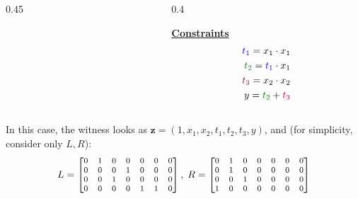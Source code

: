 \documentclass{zkdl-presentation-template}
\begin{document}
\begin{frame}
\begin{example}
\begin{columns}
\begin{column}{0.45\textwidth}
\begin{center}
{
        }
    \end{center}
\end{column}

\begin{column}{0.4\textwidth}
    \begin{center}
        \underline{\textbf{Constraints}}
        \begin{align*}
            \textcolor{blue}{t_1} = x_1 \cdot x_1 \\
            \textcolor{green!50!black}{t_2} = \textcolor{blue}{t_1} \cdot x_1 \\
            \textcolor{purple}{t_3} = x_2 \cdot x_2 \\
            y = \textcolor{green!50!black}{t_2} + \textcolor{purple}{t_3}
        \end{align*}
    \end{center}
\end{column}
\end{columns}

\vspace{10px}

\pause In this case, the witness looks as $\boldsymbol{z} = (1,x_1,x_2,t_1,t_2,t_3,y)$,
and (for simplicity, consider only $L,R$):
\begin{gather*}
    \footnotesize L = \begin{bmatrix}
        0 & 1 & 0 & 0 & 0 & 0 & 0\\
        0 & 0 & 0 & 1 & 0 & 0 & 0 \\
        0 & 0 & 1 & 0 & 0 & 0 & 0 \\
        0 & 0 & 0 & 0 & 1 & 1 & 0
    \end{bmatrix}, \; R = \begin{bmatrix}
        0 & 1 & 0 & 0 & 0 & 0 & 0\\
        0 & 1 & 0 & 0 & 0 & 0 & 0 \\
        0 & 0 & 1 & 0 & 0 & 0 & 0 \\
        1 & 0 & 0 & 0 & 0 & 0 & 0
    \end{bmatrix}
\end{gather*}

\end{example}

\end{frame}
\end{document}
